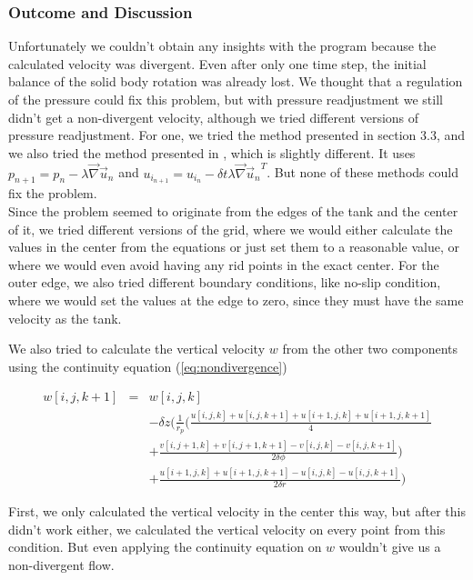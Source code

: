 \documentclass[12pt, a4paper]{article} %
\begin{document}
		\subsubsection{Outcome and Discussion}
			Unfortunately we couldn't obtain any insights with the program because the calculated velocity was divergent. Even after only one time step, the initial balance of the solid body rotation was already lost. We thought that a regulation of the pressure  could fix this problem, but with pressure readjustment we still  didn't get a non-divergent velocity, although we tried different versions of pressure readjustment. 
			For one, we tried the method presented in section 3.3, and we also tried the method presented in \cite{Schmittfull2005}
			, which is slightly different. It uses $p_{n+1} = p_n - \lambda \vec{\nabla} \vec{u}_n$ and $u_{i_{n+1}} = u_{i_{n}} - \delta t \lambda \vec{\nabla}{\vec{u}_n}^T$. But none of these methods could fix the problem.\\
			
			Since the problem seemed to originate from the edges of the tank and the center of it, we tried different versions of the grid, where we would either calculate the values in the center from the equations or just set them to a reasonable value, or where we would even avoid having any rid points in the exact center. For the outer edge, we also tried different boundary conditions, like no-slip condition, where we would set the values at the edge to zero, since they must have the same velocity as the tank.
			
			We also tried to calculate the vertical velocity $w$ from the other two components using the continuity equation (\ref{eq:nondivergence})
			
			\begin{eqnarray}
				w[i,j,k+1] &=& w[i,j,k]
				\nonumber \\
				&&- \delta z \Bigg( \frac{1}{r_p}\bigg( \frac{u[i,j,k]+u[i,j,k+1]+u[i+1,j,k]+u[i+1,j,k+1]}{4}
				\nonumber \\
				&&+ \frac{v[i,j+1,k]+v[i,j+1,k+1]-v[i,j,k]-v[i,j,k+1]}{2\delta\phi} \bigg) 
				\nonumber \\
				&&+\frac{u[i+1,j,k]+u[i+1,j,k+1]-u[i,j,k]-u[i,j,k+1]}{2\delta r} \Bigg)
				\label{eq: neues w_c}
			\end{eqnarray}
			
			First, we only calculated the vertical velocity in the center this way, but after this didn't work either, we calculated the vertical velocity on every point from this condition. But even applying the continuity equation on $w$ wouldn't give us a non-divergent flow.
			
\end{document}
